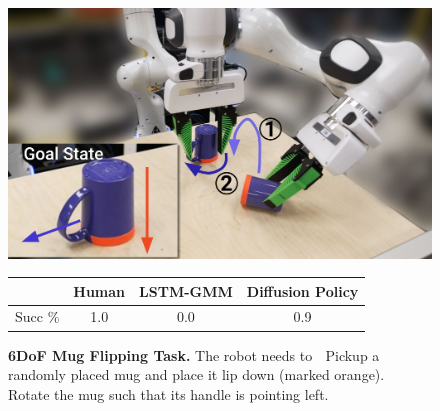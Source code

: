 \documentclass[Afour,sageh,times]{sagej}
\begin{document}
\begin{figure}[t]
\centering
\includegraphics[width=0.9\linewidth]{figure/mug_task.pdf}

\vspace{1.5mm}
\begin{tabular}{c|c|c|c}
\toprule
        & Human & LSTM-GMM & Diffusion Policy \\
\midrule
Succ \% & 1.0   & 0.0      & 0.9             \\
\bottomrule
\end{tabular}
\caption{
\textbf{6DoF Mug Flipping Task.}
\label{fig:mug_task}
The robot needs to
\textcircled{} Pickup a randomly placed mug and place it lip down (marked orange).
\textcircled{} Rotate the mug such that its handle is pointing left.
}

\vspace{-4mm}
\end{figure}
\end{document}
